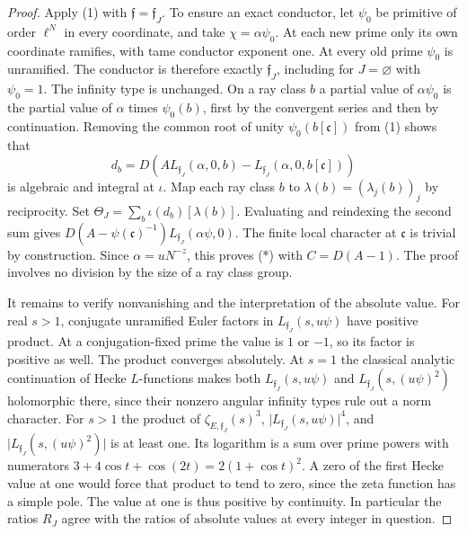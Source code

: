 \documentclass[a4paper,11pt]{article}
\theoremstyle{definition}
\theoremstyle{remark}
\numberwithin{equation}{section}
\begin{document}
\begin{proof}
Apply (1) with \(\mathfrak f=\mathfrak f_J\). To ensure an exact
conductor, let \(\psi_0\) be primitive of order \(\ell^N\) in every
coordinate, and take \(\chi=\alpha\psi_0\). At each new prime
only its own coordinate ramifies, with tame conductor exponent one.
At every old prime \(\psi_0\) is unramified. The conductor is
therefore exactly \(\mathfrak f_J\), including for \(J=\varnothing\)
with \(\psi_0=1\). The infinity type is unchanged. On a ray class
\(b\) a partial value of \(\alpha\psi_0\) is the partial value of
\(\alpha\) times \(\psi_0(b)\), first by the convergent series and
then by continuation. Removing the common root of unity
\(\psi_0(b[\mathfrak c])\) from (1) shows that
\[
 d_b=D\left(A L_{\mathfrak f_J}(\alpha,0,b)
              -L_{\mathfrak f_J}(\alpha,0,b[\mathfrak c])\right)
\]
is algebraic and integral at \(\iota\). Map each ray class \(b\)
to \(\lambda(b)=(\lambda_j(b))_j\) by reciprocity. Set
\(\Theta_J=\sum_b\iota(d_b)[\lambda(b)]\). Evaluating and reindexing
the second sum gives
\(D(A-\psi(\mathfrak c)^{-1})L_{\mathfrak f_J}(\alpha\psi,0)\).
The finite local character at \(\mathfrak c\) is trivial by
construction. Since \(\alpha=uN^{-z}\), this proves (*) with
\(C=D(A-1)\). The proof involves no division by the size of a ray
class group.

It remains to verify nonvanishing and the interpretation of the
absolute value. For real \(s>1\), conjugate unramified Euler factors
in \(L_{\mathfrak f_J}(s,u\psi)\) have positive product. At a
conjugation-fixed prime the value is \(1\) or \(-1\), so its factor
is positive as well. The product converges absolutely. At \(s=1\)
the classical analytic continuation of Hecke \(L\)-functions makes
both \(L_{\mathfrak f_J}(s,u\psi)\) and
\(L_{\mathfrak f_J}(s,(u\psi)^2)\) holomorphic there, since their
nonzero angular infinity types rule out a norm character. For
\(s>1\) the product of \(\zeta_{E,\mathfrak f_J}(s)^3\),
\(\lvert L_{\mathfrak f_J}(s,u\psi)\rvert^4\), and
\(\lvert L_{\mathfrak f_J}(s,(u\psi)^2)\rvert\) is at least one.
Its logarithm is a sum over prime powers with numerators
\(3+4\cos t+\cos(2t)=2(1+\cos t)^2\). A zero of the first
Hecke value at one would force that product to tend to zero, since
the zeta function has a simple pole. The value at one is thus
positive by continuity. In particular the ratios \(R_J\) agree
with the ratios of absolute values at every integer in question.
\end{proof}
\end{document}
